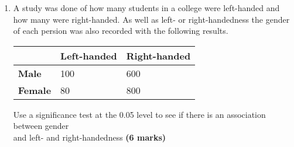 \documentclass[fleqn]{article}
\begin{document}
\begin{enumerate}
    \item A study was done of how many students in a college were left-handed and how many were right-handed. As well as left- or right-handedness the gender of each persion was also recorded with the following results.
        \begin{center}
            \begin{minipage}[t]{0.45\linewidth}
                \begin{tabularx}{\textwidth}{|X|*2{P{25mm}|}}
                      & \textbf{Left-handed} & \textbf{Right-handed}         \\\hline
                    \textbf{Male}          & 100                  & 600                           \\\hline
                    \textbf{Female}        & 80                   & 800                           \\\hline
                \end{tabularx}
                \vspace{3mm}
            \end{minipage}
        \end{center}
        Use a significance test at the 0.05 level to see if there is an association between gender\\ and left- and right-handedness \hfill\textbf{(6 marks)}
        

\end{enumerate}
\end{document}
